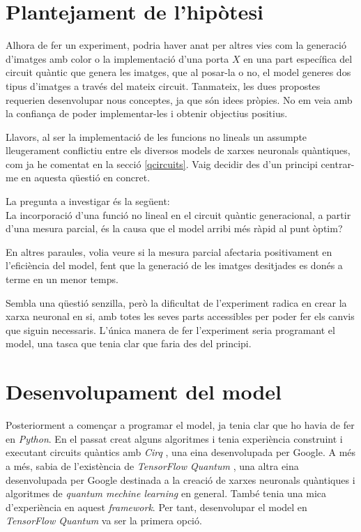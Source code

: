 \chapter{Plantejament de l'hipòtesi}

Alhora de fer un experiment, podria haver anat per altres vies com la generació d'imatges amb color o la implementació d'una porta $X$ en una part específica del circuit quàntic que genera les imatges, que al posar-la o no, el model generes dos tipus d'imatges a través del mateix circuit. Tanmateix, les dues propostes requerien desenvolupar nous conceptes, ja que són idees pròpies. No em veia amb la confiança de poder implementar-les i obtenir objectius positius.

Llavors, al ser la implementació de les funcions no lineals un assumpte lleugerament conflictiu entre els diversos models de xarxes neuronals quàntiques, com ja he comentat en la secció \ref{qcircuits}.  Vaig decidir des d'un principi centrar-me en aquesta qüestió en concret.

La pregunta a investigar és la següent: \\
La incorporació d'una funció no lineal en el circuit quàntic generacional, a partir d'una mesura parcial, és la causa que el model arribi més ràpid al punt òptim?

En altres paraules, volia veure si la mesura parcial afectaria positivament en l'eficiència del model, fent que la generació de les imatges desitjades es donés a terme en un menor temps.

Sembla una qüestió senzilla, però la dificultat de l'experiment radica en crear la xarxa neuronal en si, amb totes les seves parts accessibles per poder fer els canvis que siguin necessaris. L'única manera de fer l'experiment seria programant el model, una tasca que tenia clar que faria des del principi.

\chapter{Desenvolupament del model}

Posteriorment a començar a programar el model, ja tenia clar que ho havia de fer en \textit{Python}. En el passat creat alguns algoritmes i tenia experiència construint i executant circuits quàntics amb \textit{Cirq} \cite{cirq}, una eina desenvolupada per Google. A més a més, sabia de l'existència de \textit{TensorFlow Quantum} \cite{tfq}, una altra eina desenvolupada per Google destinada a la creació de xarxes neuronals quàntiques i algoritmes de \textit{quantum mechine learning} en general. També tenia una mica d'experiència en aquest \textit{framework}. Per tant, desenvolupar el model en \textit{TensorFlow Quantum} va ser la primera opció. 


